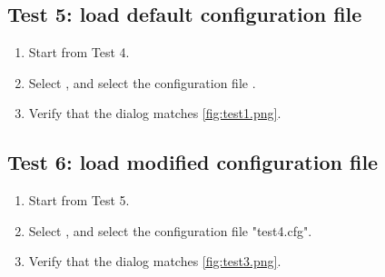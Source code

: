 \subsection{Test 5: load default configuration file}
\begin{enumerate}
\item Start from Test 4.
\item Select  \textrightarrow {}, and select the configuration file .
\item Verify that the dialog matches \autoref{fig:test1.png}.
\end{enumerate}

\subsection{Test 6: load modified configuration file}
\begin{enumerate}
\item Start from Test 5.
\item Select  \textrightarrow {}, and select the configuration file "test4.cfg".
\item Verify that the dialog matches \autoref{fig:test3.png}.
\end{enumerate}

